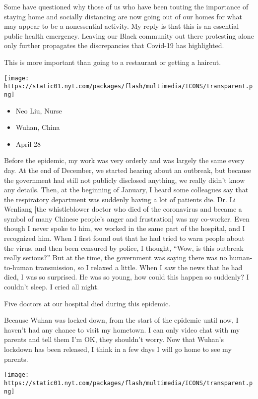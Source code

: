 Some have questioned why those of us who have been touting the
importance of staying home and socially distancing are now going out of
our homes for what may appear to be a nonessential activity. My reply is
that this is an essential public health emergency. Leaving our Black
community out there protesting alone only further propagates the
discrepancies that Covid-19 has highlighted.

This is more important than going to a restaurant or getting a haircut.

\texttt{[image: https://static01.nyt.com/packages/flash/multimedia/ICONS/transparent.png]}

\begin{itemize}
\tightlist
\item
  Neo Liu, Nurse
\item
  Wuhan, China
\item
  April 28
\end{itemize}

Before the epidemic, my work was very orderly and was largely the same
every day. At the end of December, we started hearing about an outbreak,
but because the government had still not publicly disclosed anything, we
really didn't know any details. Then, at the beginning of January, I
heard some colleagues say that the respiratory department was suddenly
having a lot of patients die. Dr. Li Wenliang {[}the whistleblower
doctor who died of the coronavirus and became a symbol of many Chinese
people's anger and frustration{]} was my co-worker. Even though I never
spoke to him, we worked in the same part of the hospital, and I
recognized him. When I first found out that he had tried to warn people
about the virus, and then been censured by police, I thought, ``Wow, is
this outbreak really serious?'' But at the time, the government was
saying there was no human-to-human transmission, so I relaxed a little.
When I saw the news that he had died, I was so surprised. He was so
young, how could this happen so suddenly? I couldn't sleep. I cried all
night.

Five doctors at our hospital died during this epidemic.

Because Wuhan was locked down, from the start of the epidemic until now,
I haven't had any chance to visit my hometown. I can only video chat
with my parents and tell them I'm OK, they shouldn't worry. Now that
Wuhan's lockdown has been released, I think in a few days I will go home
to see my parents.

\texttt{[image: https://static01.nyt.com/packages/flash/multimedia/ICONS/transparent.png]}


